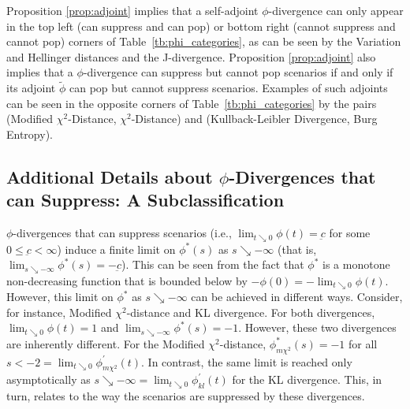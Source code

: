 \documentclass[opre,nonblindrev]{informs3} %
\begin{document}
Proposition \ref{prop:adjoint} implies that a self-adjoint $\phi$-divergence can only appear in the top left (can suppress and can pop) or bottom right (cannot suppress and cannot pop) corners of Table~\ref{tb:phi_categories}, as can be seen by the Variation and Hellinger distances and the J-divergence. 
Proposition \ref{prop:adjoint} also implies that a $\phi$-divergence can suppress but cannot pop scenarios if and only if its adjoint $\tilde{\phi}$ can pop but cannot suppress scenarios. 
Examples of such adjoints can be seen in the opposite corners of Table~\ref{tb:phi_categories} by the pairs (Modified $\chi^2$-Distance,  $\chi^2$-Distance) and (Kullback-Leibler Divergence, Burg Entropy).  







\subsection{Additional Details about $\phi$-Divergences that can Suppress: A Subclassification}
\label{ssec:suppress}


$\phi$-divergences that can suppress scenarios (i.e., $\lim_{t \searrow 0} \phi(t) = \underbar{c}$ for some $0\leq \underbar{c}< \infty$) induce a finite limit on $\phi^*(s)$ as $s \searrow -\infty$ (that is, $\lim_{s \searrow -\infty}\phi^*(s)=-\underbar{c}$). 
This can be seen from the fact that $\phi^*$ is a monotone non-decreasing function that is bounded below by $-\phi(0)=-\lim_{t \searrow 0}\phi(t)$. 
However, this limit on $\phi^*$ as  $s \searrow -\infty$ can be achieved in different ways. 
Consider, for instance, Modified $\chi^2$-distance and KL divergence. 
For both divergences,  $\lim_{t \searrow 0} \phi(t) = 1$ and $\lim_{s \searrow -\infty}\phi^*(s)=-1$. 
However, these two divergences are inherently different. 
For the Modified  $\chi^2$-distance, $\phi_{m\chi^2}^*(s)=-1$ for all $s < -2 = \lim_{t \searrow 0} \phi_{m\chi^2}^{\prime}(t)$. 
In contrast, the same limit is reached only asymptotically as $s \searrow -\infty = \lim_{t \searrow 0} \phi_{kl}^{\prime}(t)$ for the KL divergence. 
This, in turn, relates to the way the scenarios are suppressed by these divergences. 
\end{document}

